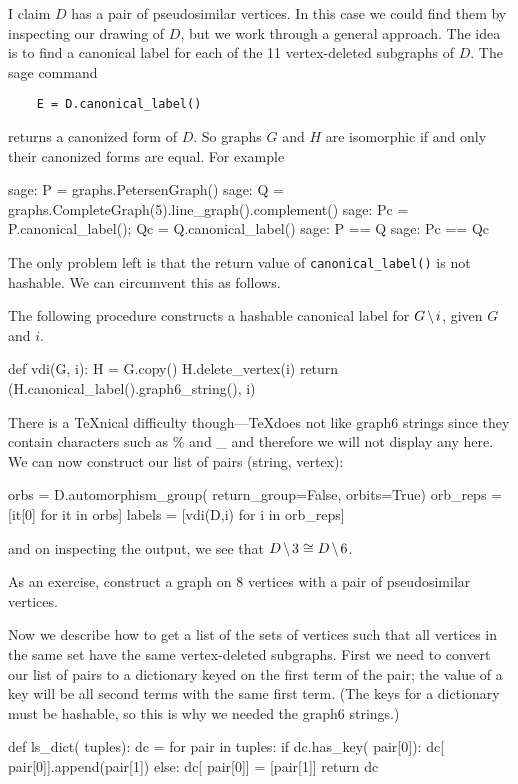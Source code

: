 I claim $D$ has a pair of pseudosimilar vertices. In this case we could find them
by inspecting our drawing of $D$, but we work through a general approach.
The idea is to find a canonical label for each of the 11 vertex-deleted subgraphs
of $D$. The sage command
\begin{verbatim}
    E = D.canonical_label()
\end{verbatim}
returns a canonized form of $D$. So graphs $G$ and $H$ are isomorphic if and only
their canonized forms are equal. For example
\begin{sageexample}
    sage: P = graphs.PetersenGraph()
    sage: Q = graphs.CompleteGraph(5).line_graph().complement()
    sage: Pc = P.canonical_label(); Qc = Q.canonical_label()
    sage: P == Q
    sage: Pc == Qc
\end{sageexample}
The only problem left is that the return value of \verb|canonical_label()|
is not hashable. We can circumvent this as follows.

The following procedure constructs a hashable canonical label for 
$G\mathbin{\mkern-1.5mu\setminus\mkern-1.5mu} i$, given $G$ and $i$.
\begin{sageblock}
def vdi(G, i):
    H = G.copy()
    H.delete_vertex(i)
    return (H.canonical_label().graph6_string(), i)
\end{sageblock}
There is a \TeX nical difficulty though---\TeX does not like graph6 strings
since they contain characters such as \% and \_ and therefore we will not display 
any here. We can now construct our list of pairs (string, vertex):
\begin{sageblock}
    orbs = D.automorphism_group( return_group=False, orbits=True)
    orb_reps = [it[0] for it in orbs]
    labels = [vdi(D,i) for i in orb_reps]
\end{sageblock}
and on inspecting the output, we see that $D\mathbin{\mkern-1.5mu\setminus\mkern-1.5mu} 3\cong D\mathbin{\mkern-1.5mu\setminus\mkern-1.5mu} 6$.

As an exercise, construct a graph on 8 vertices with a pair of pseudosimilar
vertices.

Now we describe how to get a list of the sets of vertices such that all
vertices in the same set have the same vertex-deleted subgraphs.
First we need to convert our list of pairs to a dictionary keyed on the 
first term of the pair; the value of a key will be all second terms 
with the same first term. (The keys for a dictionary must be hashable, so this
is why we needed the graph6 strings.)
\begin{sageblock}
def ls_dict( tuples):
    dc = {} 
    for pair in tuples:
        if dc.has_key( pair[0]):
            dc[ pair[0]].append(pair[1])
        else:
            dc[ pair[0]] = [pair[1]]
    return dc
\end{sageblock}

